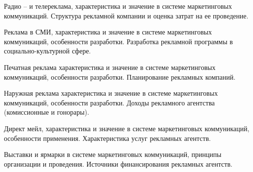 \documentclass[
	14pt,
	a4paper,
	]
	{scrartcl}
\begin{document}
\vfill

\newpage


\shapk
{}
\setcounter{zad}{0}

\vfill
\z Радио – и телереклама, характеристика и значение в системе маркетинговых коммуникаций.
 \vfill
\z Структура рекламной компании и оценка затрат на ее проведение.
 \vfill

\vfill

\newpage


\shapk
{}
\setcounter{zad}{0}

\vfill
\z Реклама в СМИ, характеристика и значение в системе маркетинговых коммуникаций, особенности разработки.
 \vfill
\z Разработка рекламной программы в социально-культурной сфере.
 \vfill

\vfill

\newpage


\shapk
{}
\setcounter{zad}{0}

\vfill
\z Печатная реклама характеристика и значение в системе маркетинговых коммуникаций, особенности разработки.
 \vfill
\z Планирование рекламных компаний.
 \vfill

\vfill

\newpage


\shapk
{}
\setcounter{zad}{0}

\vfill
\z Наружная реклама характеристика и значение в системе маркетинговых коммуникаций, особенности разработки.
 \vfill
\z Доходы рекламного агентства (комиссионные и гонорары).
 \vfill

\vfill

\newpage


\shapk
{}
\setcounter{zad}{0}

\vfill
\z Директ мейл, характеристика и значение в системе маркетинговых коммуникаций, особенности применения.
 \vfill
\z Характеристика услуг рекламных агентств.
 \vfill

\vfill

\newpage


\shapk
{}
\setcounter{zad}{0}

\vfill
\z Выставки и ярмарки в системе маркетинговых коммуникаций, принципы организации и проведения.
 \vfill
\z Источники финансирования рекламных агентств.
 \vfill

\vfill

\newpage


\shapk
{}
\setcounter{zad}{0}
\end{document}
